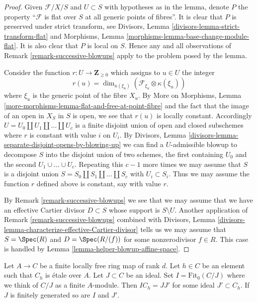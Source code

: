 \begin{proof}
Given $\mathcal{F}/X/S$ and $U \subset S$ with hypotheses as
in the lemma, denote $P$ the property ``$\mathcal{F}$ is flat over $S$ at
all generic points of fibres''. It is clear that $P$ is preserved under
strict transform, see
Divisors, Lemma \ref{divisors-lemma-strict-transform-flat}
and Morphisms, Lemma \ref{morphisms-lemma-base-change-module-flat}.
It is also clear that $P$ is local on $S$. Hence any and all observations
of Remark \ref{remark-successive-blowups} apply to the problem posed by
the lemma.

\medskip\noindent
Consider the function $r : U \to \mathbf{Z}_{\geq 0}$ which assigns to
$u \in U$ the integer
$$
r(u) = \dim_{\kappa(\xi_u)}(\mathcal{F}_{\xi_u} \otimes \kappa(\xi_u))
$$
where $\xi_u$ is the generic point of the fibre $X_u$.
By More on Morphisms, Lemma
\ref{more-morphisms-lemma-flat-and-free-at-point-fibre}
and the fact that the image of an open in $X_S$ in $S$ is open,
we see that $r(u)$ is locally constant. Accordingly
$U = U_0 \amalg U_1 \amalg \ldots \amalg U_c$ is a finite disjoint
union of open and closed subschemes where $r$ is constant with value
$i$ on $U_i$. By
Divisors, Lemma \ref{divisors-lemma-separate-disjoint-opens-by-blowing-up}
we can find a $U$-admissible blowup to decompose $S$ into
the disjoint union of two schemes, the first containing $U_0$ and
the second $U_1 \cup \ldots \cup U_c$. Repeating this $c - 1$
more times we may assume that $S$ is a disjoint union
$S = S_0 \amalg S_1 \amalg \ldots \amalg S_c$ with $U_i \subset S_i$.
Thus we may assume the function $r$ defined above is constant, say
with value $r$.

\medskip\noindent
By Remark \ref{remark-successive-blowups} we see that we may assume that
we have an effective Cartier divisor $D \subset S$ whose support is
$S \setminus U$. Another application of Remark \ref{remark-successive-blowups}
combined with
Divisors, Lemma \ref{divisors-lemma-characterize-effective-Cartier-divisor}
tells us we may assume that
$S = \Spec(R)$ and $D = \Spec(R/(f))$ for some nonzerodivisor
$f \in R$. This case is handled by
Lemma \ref{lemma-helper-blowup-affine-space}.
\end{proof}

\begin{lemma}
\label{lemma-trick-fitting-ideal}
Let $A \to C$ be a finite locally free ring map of rank $d$.
Let $h \in C$ be an element such that $C_h$ is \'etale over $A$.
Let $J \subset C$ be an ideal. Set $I = \text{Fit}_0(C/J)$ where we
think of $C/J$ as a finite $A$-module. Then $IC_h = JJ'$ for some ideal
$J' \subset C_h$. If $J$ is finitely generated so are $I$ and $J'$.
\end{lemma}

